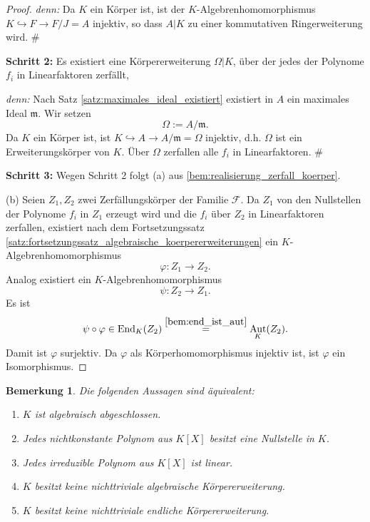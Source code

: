 \documentclass[a4paper, twoside, 11pt, ngerman]{report}
\newcommand{\calF}{\mathcal F}
\DeclareMathOperator{\Aut}{Aut}
\theoremstyle{definistyle}
\newtheorem{bem}[satz]{Bemerkung}
\theoremstyle{remark}
\newenvironment{denn}%
  {\par\textit{denn:}}%
  {\hfill\#\par}
\begin{document}
\begin{proof}
\begin{denn}
Da $K$ ein Körper ist, ist der $K$-Algebrenhomomorphismus $K \hookrightarrow F\to F/J=A$ injektiv, so dass $A|K$ zu einer kommutativen Ringerweiterung wird.
\end{denn}
\textbf{Schritt 2:} Es existiert eine Körpererweiterung $\Omega|K$, über der jedes der Polynome $f_i$ in Linearfaktoren zerfällt,
\begin{denn}
Nach Satz \ref{satz:maximales_ideal_existiert} existiert in $A$ ein maximales Ideal $\mathfrak{m}$. Wir setzen
\[
\Omega := A/\mathfrak{m}.
\]
Da $K$ ein Körper ist, ist $K \hookrightarrow A \to A/\mathfrak{m} = \Omega$ injektiv, d.h. $\Omega$ ist ein Erweiterungskörper von $K$. Über $\Omega$ zerfallen alle $f_i$ in Linearfaktoren.
\end{denn}

\textbf{Schritt 3:} Wegen Schritt 2 folgt (a) aus \ref{bem:realisierung_zerfall_koerper}.

(b) Seien $Z_1, Z_2$ zwei Zerfällungskörper der Familie $\calF$.  
Da $Z_1$ von den Nullstellen der Polynome $f_i$ in $Z_1$ erzeugt wird und die $f_i$ über $Z_2$ in Linearfaktoren zerfallen, existiert nach dem Fortsetzungssatz \ref{satz:fortsetzungssatz_algebraische_koerpererweiterungen} ein $K$-Algebren\-homomorphismus
\[
\varphi \colon Z_1 \to Z_2.
\]
Analog existiert ein $K$-Algebren\-homomorphismus
\[
\psi \colon Z_2 \to Z_1.
\]
Es ist
\[
\psi \circ \varphi \in \operatorname{End}_K(Z_2) \overset{\ref{bem:end_ist_aut}}{=} \Aut_K(Z_2).
\]
Damit ist $\varphi$ surjektiv. Da $\varphi$ als Körperhomomorphismus injektiv ist,
ist $\varphi$ ein Isomorphismus.
\end{proof}

\begin{bem}\label{bem:algebraisch_abgeschlossen}
Die folgenden Aussagen sind äquivalent:
\begin{enumerate}[label=(\roman*)]
\item $K$ ist algebraisch abgeschlossen.
\item Jedes nichtkonstante Polynom aus $K[X]$ besitzt eine Nullstelle in $K$.
\item Jedes irreduzible Polynom aus $K[X]$ ist linear.
\item $K$ besitzt keine nichttriviale algebraische Körpererweiterung.
\item $K$ besitzt keine nichttriviale endliche Körpererweiterung.
\end{enumerate}
\end{bem}
\end{document}
